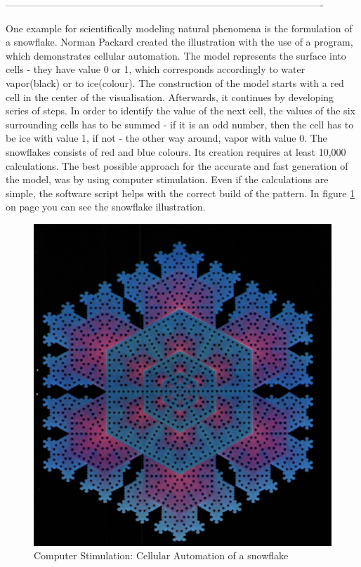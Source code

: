 -------------------------------------------------------------------------------------------------

One example for scientifically modeling natural phenomena is the formulation of a snowflake. Norman Packard created the illustration with the use of a program, which demonstrates cellular automation.\cite{wolfram1984computer}\cite{packard1986lattice} The model represents the surface into cells - they have value 0 or 1, which corresponds accordingly to water vapor(black) or to ice(colour). The construction of the model starts with a red cell in the center of the visualisation. Afterwards, it continues by developing series of steps. In order to identify the value of the next cell, the values of the six surrounding cells has to be summed - if it is an odd number, then the cell has to be ice with value 1, if not - the other way around, vapor with value 0. The snowflakes consists of red and blue colours. Its creation requires at least 10,000 calculations. The best possible approach for the accurate and fast generation of the model, was by using computer stimulation. Even if the calculations are simple, the software script helps with the correct build of the pattern.\cite{wolfram1984computer} In figure \ref{fig:snowflake} on page \pageref{fig:snowflake} you can see the snowflake illustration.

\begin{figure}[h]
\centering
\includegraphics[scale=0.6]{images/snowflake_algorithm}
\caption{Computer Stimulation: Cellular Automation of a snowflake}
\label{fig:snowflake}
\end{figure}

